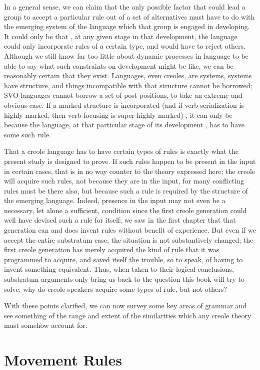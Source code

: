 In a general sense, we can claim that the only possible factor that could lead a group to accept a particular rule out of a set of alternatives must have to do with the emerging system of the language which that group is engaged in developing. It could only be that , at any given stage in that development, the language could only incorpor\-ate rules of a certain type, and would have to reject others. Although we still know far too little about dynamic processes in language to be able to say what such constraints on development might be like, we can be reasonably certain that they exist. Languages, even creoles, are systems, systems have structure, and things incompatible with that structure cannot be borrowed; SVO languages cannot borrow a set of post positions, to take an extreme and obvious case. If a marked struc\-ture is incorporated (and if verb-serialization is highly marked, then verb-focusing is super-highly marked) , it can only be because the language, at that particular stage of its development , has to have some such rule.

That a creole language has to have certain types of rules is
exactly what the present study is designed to prove. If such rules happen to be present in the input in certain cases, that is in no way counter to the theory expressed here; the creole will acquire such rules, not because they are in the input, for many conflicting rules must be there also, but because such a rule is required by the struc\-ture of the emerging language. Indeed, presence in the input may not even be a necessary, let alone a sufficient, condition since the first creole generation could well have devised such a rule for itself; we saw in the first chapter that that generation can and does invent rules without benefit of experience. But even if we accept the entire sub\-stratum case, the situation is not substantively changed; the first creole generation has merely acquired the kind of rule that it was programmed to acquire, and saved itself the trouble, so to speak, of having to invent something equivalent. Thus, when taken to their logical conclusions, substratum arguments only bring us back to the question this book will try to solve: why do creole speakers acquire some types of rule, but not others?

With these points clarified, we can now survey some key areas of grammar and see something of the range and extent of the similarities which any creole theory must somehow account for.

\section{Movement Rules}

